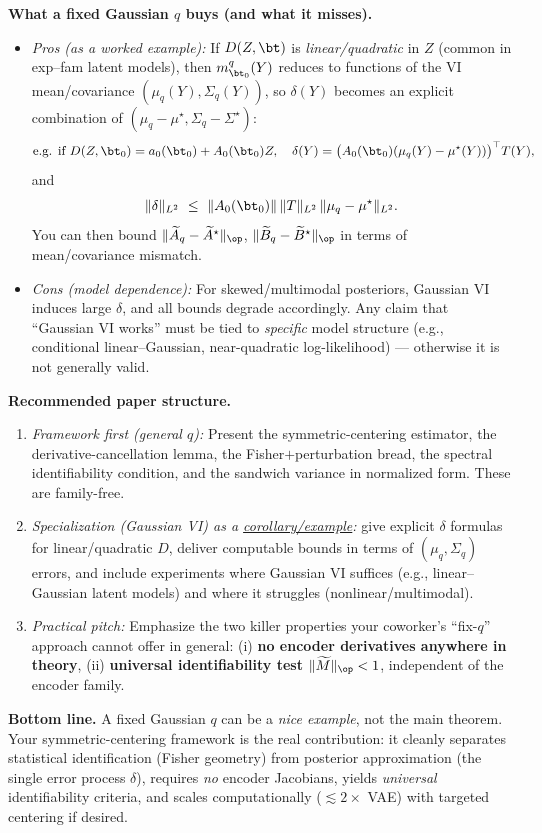\medskip
\noindent\textbf{What a fixed Gaussian $q$ buys (and what it misses).}
\begin{itemize}
\item \emph{Pros (as a worked example):} If $D(Z,\bt)$ is \emph{linear/quadratic} in $Z$ (common in exp–fam latent models), then $m_{\bt_0}^q(Y)$ reduces to functions of the VI mean/covariance $(\mu_q(Y),\Sigma_q(Y))$, so $\delta(Y)$ becomes an explicit combination of $(\mu_q-\mu^\star,\Sigma_q-\Sigma^\star)$:
\[
\text{e.g. if }D(Z,\bt_0)=a_0(\bt_0)+A_0(\bt_0)Z,\quad
\delta(Y)=\big(A_0(\bt_0)(\mu_q(Y)-\mu^\star(Y))\big)^\top T(Y),
\]
and
\[
\|\delta\|_{L^2}\ \le\ \|A_0(\bt_0)\|\,\|T\|_{L^2}\,\|\mu_q-\mu^\star\|_{L^2}.
\]
You can then bound $\|\widetilde A_q-\widetilde A^\star\|_{\op}$, $\|\widetilde B_q-\widetilde B^\star\|_{\op}$ in terms of mean/covariance mismatch.
\item \emph{Cons (model dependence):} For skewed/multimodal posteriors, Gaussian VI induces large $\delta$, and all bounds degrade accordingly. Any claim that “Gaussian VI works” must be tied to \emph{specific} model structure (e.g., conditional linear–Gaussian, near-quadratic log-likelihood) — otherwise it is not generally valid.
\end{itemize}

\medskip
\noindent\textbf{Recommended paper structure.}
\begin{enumerate}
\item \emph{Framework first (general $q$):} Present the symmetric-centering estimator, the derivative-cancellation lemma, the Fisher$+$perturbation bread, the spectral identifiability condition, and the sandwich variance in normalized form. These are family-free.
\item \emph{Specialization (Gaussian VI) as a \underline{corollary/example}:} 
give explicit $\delta$ formulas for linear/quadratic $D$, deliver computable bounds in terms of $(\mu_q,\Sigma_q)$ errors, and include experiments where Gaussian VI suffices (e.g., linear–Gaussian latent models) and where it struggles (nonlinear/multimodal).
\item \emph{Practical pitch:} Emphasize the two killer properties your coworker’s “fix-$q$” approach cannot offer in general: 
(i) \textbf{no encoder derivatives anywhere in theory}, 
(ii) \textbf{universal identifiability test} $\|\widetilde M\|_{\op}<1$, independent of the encoder family.
\end{enumerate}

\medskip
\noindent\textbf{Bottom line.} 
A fixed Gaussian $q$ can be a \emph{nice example}, not the main theorem. 
Your symmetric-centering framework is the real contribution: it cleanly separates statistical identification (Fisher geometry) from posterior approximation (the single error process $\delta$), requires \emph{no} encoder Jacobians, yields \emph{universal} identifiability criteria, and scales computationally (\(\lesssim 2\times\) VAE) with targeted centering if desired.
